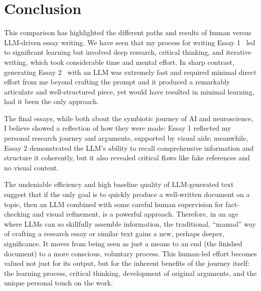 \documentclass[11pt,a4paper]{article}
\begin{document}
\section{Conclusion}

This comparison has highlighted the different paths and results of human versus LLM-driven essay writing. We have seen that my process for writing Essay 1~\cite{essay1} led to significant learning but involved deep research, critical thinking, and iterative writing, which took considerable time and mental effort. In sharp contrast, generating Essay 2~\cite{essay2} with an LLM was extremely fast and required minimal direct effort from me beyond crafting the prompt and it produced a remarkably articulate and well-structured piece, yet would have resulted in minimal learning, had it been the only approach.

The final essays, while both about the symbiotic journey of AI and neuroscience, I believe showed a reflection of how they were made: Essay 1 reflected my personal research journey and arguments, supported by visual aids; meanwhile, Essay 2 demonstrated the LLM's ability to recall comprehensive information and structure it coherently, but it also revealed critical flaws like fake references and no visual content.

The undeniable efficiency and high baseline quality of LLM-generated text suggest that if the only goal is to quickly produce a well-written document on a topic, then an LLM combined with some careful human supervision for fact-checking and visual refinement, is a powerful approach. Therefore, in an age where LLMs can so skillfully assemble information, the traditional, ``manual'' way of crafting a research essay or similar text gains a new, perhaps deeper, significance. It moves from being seen as just a means to an end (the finished document) to a more conscious, voluntary process. This human-led effort becomes valued not just for its output, but for the inherent benefits of the journey itself: the learning process, critical thinking, development of original arguments, and the unique personal touch on the work.

\clearpage
\nocite{*}
\printbibliography
\end{document}
